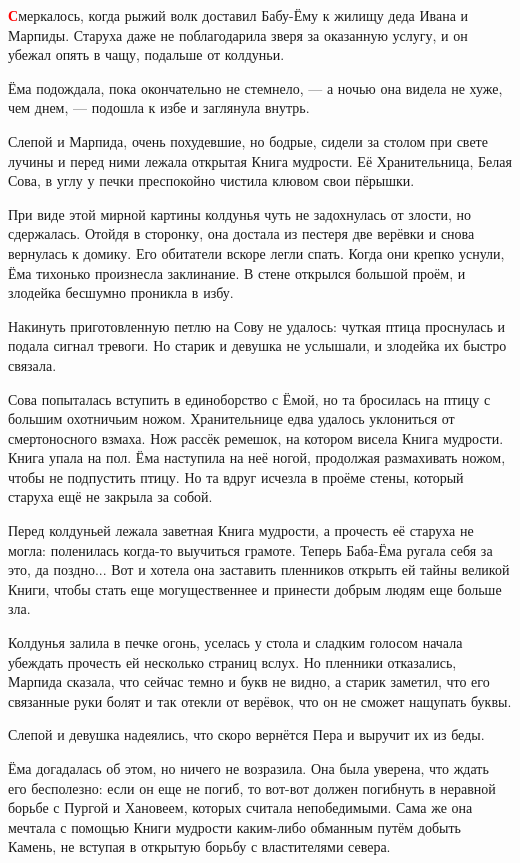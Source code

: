 \documentclass[12pt, a4paper, openany]{book}
\begin{document}
	\lettrine[findent=0pt]{\textbf{\textcolor{red}{С}}}{}меркалось, когда рыжий волк доставил Бабу-Ёму к жилищу деда Ивана и Марпиды. Старуха даже не поблагодарила зверя за оказанную услугу, и он убежал опять в чащу, подальше от колдуньи.
	
	Ёма подождала, пока окончательно не стемнело, — а ночью она видела не хуже, чем днем, — подошла к избе и заглянула внутрь.
	
	Слепой и Марпида, очень похудевшие, но бодрые, сидели за столом при свете лучины и перед ними лежала открытая Книга мудрости. Её Хранительница, Белая Сова, в углу у печки преспокойно чистила клювом свои пёрышки.
	
	При виде этой мирной картины колдунья чуть не задохнулась от злости, но сдержалась. Отойдя в сторонку, она достала из пестеря две верёвки и снова вернулась к домику. Его обитатели вскоре легли спать. Когда они крепко уснули, Ёма тихонько произнесла заклинание. В стене открылся большой проём, и злодейка бесшумно проникла в избу.
	
	Накинуть приготовленную петлю на Сову не удалось: чуткая птица проснулась и подала сигнал тревоги. Но старик и девушка не услышали, и злодейка их быстро связала.
	
	Сова попыталась вступить в единоборство с Ёмой, но та бросилась на птицу с большим охотничьим ножом. Хранительнице едва удалось уклониться от смертоносного взмаха. Нож рассёк ремешок, на котором висела Книга мудрости. Книга упала на пол. Ёма наступила на неё ногой, продолжая размахивать ножом, чтобы не подпустить птицу. Но та вдруг исчезла в проёме стены, который старуха ещё не закрыла за собой.
	
	Перед колдуньей лежала заветная Книга мудрости, а прочесть её старуха не могла: поленилась когда-то выучиться грамоте. Теперь Баба-Ёма ругала себя за это, да поздно... Вот и хотела она заставить пленников открыть ей тайны великой Книги, чтобы стать еще могущественнее и принести добрым людям еще больше зла.
	
	Колдунья залила в печке огонь, уселась у стола и сладким голосом начала убеждать прочесть ей несколько страниц вслух. Но пленники отказались, Марпида сказала, что сейчас темно и букв не видно, а старик заметил, что его связанные руки болят и так отекли от верёвок, что он не сможет нащупать буквы.
	
	Слепой и девушка надеялись, что скоро вернётся Пера и выручит их из беды.
	
	Ёма догадалась об этом, но ничего не возразила. Она была уверена, что ждать его бесполезно: если он еще не погиб, то вот-вот должен погибнуть в неравной борьбе с Пургой и Хановеем, которых считала непобедимыми. Сама же она мечтала с помощью Книги мудрости каким-либо обманным путём добыть Камень, не вступая в открытую борьбу с властителями севера.
	
\end{document}
